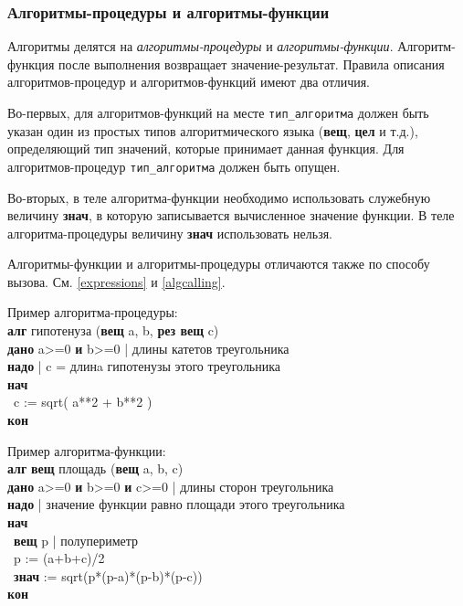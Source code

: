 \documentclass[12pt,a4paper]{article}
\newcommand{\otstup}{\textperiodcentered\ }
\begin{document}
\subsubsection{Алгоритмы-процедуры и алгоритмы-функции}

Алгоритмы делятся на \emph{алгоритмы-процедуры} и \emph{алгоритмы-функции}. Алгоритм-функция после выполнения возвращает зна\-че\-ние-ре\-зуль\-тат. Правила описания ал\-го\-рит\-мов-про\-це\-дур и алгоритмов-функций имеют два отличия.

Во-первых, для алгоритмов-функций на месте \texttt{тип\_алгоритма} должен быть указан один из простых типов алгоритмического языка (\textbf{вещ}, \textbf{цел} и т.д.), определяющий тип значений, которые принимает данная функция. Для алгоритмов-процедур \texttt{тип\_алгоритма} должен быть опущен.

Во-вторых, в теле алгоритма-функции необходимо использовать служебную величину \textbf{знач}, в которую записывается вычисленное значение функции. В теле алгоритма-процедуры величину \textbf{знач} использовать нельзя.

Алгоритмы-функции и алгоритмы-процедуры отличаются также по способу вызова. См. \ref{expressions} и \ref{algcalling}.

Пример алгоритма-процедуры:
{\sffamily~\\
\textbf{алг} гипотенуза (\textbf{вещ} a, b, \textbf{рез вещ} c)\\
\textbf{дано} a>=0 \textbf{и} b>=0 | длины катетов треугольника\\
\textbf{надо} | c = длинa гипотенузы этого треугольника\\
\textbf{нач}\\
\otstup c := sqrt( a**2 + b**2 )\\
\textbf{кон} 
}

Пример алгоритма-функции:
{\sffamily~\\
\textbf{алг} \textbf{вещ} площадь (\textbf{вещ} a, b, c)\\
\textbf{дано} a>=0 \textbf{и} b>=0 \textbf{и} c>=0 | длины сторон треугольника\\
\textbf{надо} | значение функции равно площади этого треугольника\\
\textbf{нач}\\
\otstup \textbf{вещ} p | полупериметр\\
\otstup p := (a+b+c)/2\\
\otstup \textbf{знач} := sqrt(p*(p-a)*(p-b)*(p-c))\\
\textbf{кон}
}
\end{document}
